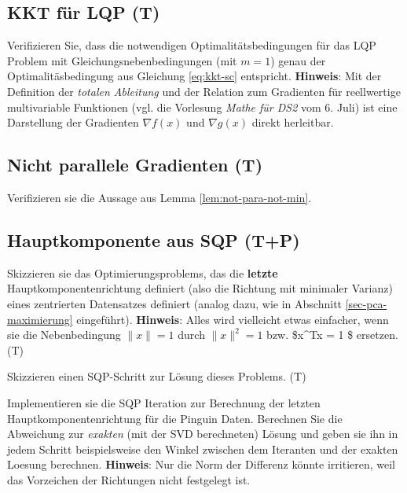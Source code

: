 \documentclass[]{book}
\theoremstyle{definition}
\theoremstyle{definition}
\theoremstyle{definition}
\theoremstyle{definition}
\theoremstyle{remark}
\begin{document}
\hypertarget{kkt-fuxfcr-lqp-t}{%
\subsection{KKT für LQP (T)}\label{kkt-fuxfcr-lqp-t}}

Verifizieren Sie, dass die notwendigen Optimalitätsbedingungen für das LQP Problem mit Gleichungsnebenbedingungen (mit \(m=1\)) genau der Optimalitäsbedingung aus Gleichung \eqref{eq:kkt-sc} entspricht. \textbf{Hinweis}: Mit der Definition der \emph{totalen Ableitung} und der Relation zum Gradienten für reellwertige multivariable Funktionen (vgl. die Vorlesung \emph{Mathe für DS2} vom 6. Juli) ist eine Darstellung der Gradienten \(\nabla f(x)\) und \(\nabla g(x)\) direkt herleitbar.

\hypertarget{nicht-parallele-gradienten-t}{%
\subsection{Nicht parallele Gradienten (T)}\label{nicht-parallele-gradienten-t}}

Verifizieren sie die Aussage aus Lemma \ref{lem:not-para-not-min}.

\hypertarget{hauptkomponente-aus-sqp-tp}{%
\subsection{Hauptkomponente aus SQP (T+P)}\label{hauptkomponente-aus-sqp-tp}}

Skizzieren sie das Optimierungsproblems, das die \textbf{letzte} Hauptkomponentenrichtung definiert (also die Richtung mit minimaler Varianz) eines zentrierten Datensatzes definiert (analog dazu, wie in Abschnitt \ref{sec-pca-maximierung} eingeführt). \textbf{Hinweis}: Alles wird vielleicht etwas einfacher, wenn sie die Nebenbedingung \(\|x\|=1\) durch \(\|x\|^2 = 1\) bzw. \$x\^{}Tx = 1 \$ ersetzen. (T)

Skizzieren einen SQP-Schritt zur Lösung dieses Problems. (T)

Implementieren sie die SQP Iteration zur Berechnung der letzten Hauptkomponentenrichtung für die Pinguin Daten. Berechnen Sie die Abweichung zur \emph{exakten} (mit der SVD berechneten) Lösung und geben sie ihn in jedem Schritt beispielsweise den Winkel zwischen dem Iteranten und der exakten Loesung berechnen. \textbf{Hinweis}: Nur die Norm der Differenz könnte irritieren, weil das Vorzeichen der Richtungen nicht festgelegt ist.
\end{document}
